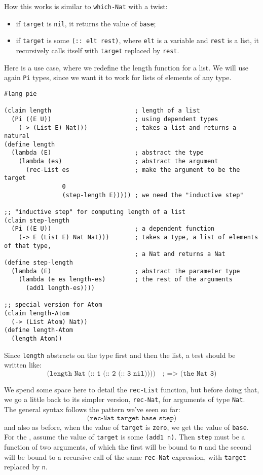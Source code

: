 How this works is similar to \texttt{which-Nat} with a twist:
\begin{itemize}
\item if \texttt{target} is \texttt{nil}, it returns the value
  of \texttt{base};
\item if \texttt{target} is some \texttt{(:: elt rest)},
  where \texttt{elt} is a variable and \texttt{rest} is a list, it
  recursively calls itself with \texttt{target} replaced by \texttt{rest}.
\end{itemize}

Here is a use case, where we redefine the length function for a list. We will
use again \texttt{Pi} types, since we want it to work for lists of elements
of any type.
{
  \small
\begin{verbatim}
#lang pie

(claim length                       ; length of a list
  (Pi ((E U))                       ; using dependent types
    (-> (List E) Nat)))             ; takes a list and returns a natural
(define length
  (lambda (E)                       ; abstract the type
    (lambda (es)                    ; abstract the argument
      (rec-List es                  ; make the argument to be the target
                0
                (step-length E))))) ; we need the "inductive step"

;; "inductive step" for computing length of a list
(claim step-length
  (Pi ((E U))                       ; a dependent function
    (-> E (List E) Nat Nat)))       ; takes a type, a list of elements of that type,
                                    ; a Nat and returns a Nat
(define step-length
  (lambda (E)                       ; abstract the parameter type
    (lambda (e es length-es)        ; the rest of the arguments
      (add1 length-es))))

;; special version for Atom
(claim length-Atom
  (-> (List Atom) Nat))
(define length-Atom
  (length Atom))
\end{verbatim}
}

Since \texttt{length} abstracts on the type first and then the list,
a test should be written like:
\[
  \texttt{(length Nat (:: 1 (:: 2 (:: 3 nil))))} \quad \texttt{; => (the Nat 3)}
\]


We spend some space here to detail the \texttt{rec-List} function, but before doing
that, we go a little back to its simpler version, \texttt{rec-Nat}, for arguments
of type \texttt{Nat}. The general syntax follows the pattern we've seen so far:
\[
  \texttt{(rec-Nat target base step)}
\]
and also as before, when the value of \texttt{target} is \texttt{zero},
we get the value of \texttt{base}. For the , assume
the value of \texttt{target} is some \texttt{(add1 n)}. Then \texttt{step} must
be a function of two arguments, of which the first will be bound to \texttt{n}
and the second will be bound to a recursive call of the same \texttt{rec-Nat}
expression, with \texttt{target} replaced by \texttt{n}.

